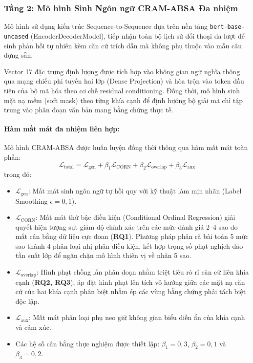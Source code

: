 \documentclass[pdflatex,sn-mathphys-num]{sn-jnl}
\theoremstyle{thmstyleone}
\theoremstyle{thmstyletwo}
\theoremstyle{thmstylethree}
\begin{document}
\subsubsection{Tầng 2: Mô hình Sinh Ngôn ngữ CRAM-ABSA Đa nhiệm}
Mô hình sử dụng kiến trúc Sequence-to-Sequence dựa trên nền tảng \texttt{bert-base-uncased} (EncoderDecoderModel), tiếp nhận toàn bộ lịch sử đối thoại đa lượt để sinh phản hồi tự nhiên kèm căn cứ trích dẫn mà không phụ thuộc vào mẫu câu dựng sẵn.

Vector 17 đặc trưng định lượng được tích hợp vào không gian ngữ nghĩa thông qua mạng chiếu phi tuyến hai lớp (Dense Projection) và hòa trộn vào token đầu tiên của bộ mã hóa theo cơ chế residual conditioning. Đồng thời, mô hình sinh mặt nạ mềm (soft mask) theo từng khía cạnh để định hướng bộ giải mã chỉ tập trung vào phân đoạn văn bản mang bằng chứng thực tế.

\paragraph{Hàm mất mát đa nhiệm liên hợp:}
Mô hình CRAM-ABSA được huấn luyện đồng thời thông qua hàm mất mát toàn phần:
\begin{equation}
    \label{eq:total_loss}
    \mathcal{L}_{\text{total}} = \mathcal{L}_{\text{gen}} + \beta_1 \mathcal{L}_{\text{CORN}} + \beta_2 \mathcal{L}_{\text{overlap}} + \beta_3 \mathcal{L}_{\text{aux}}
\end{equation}
trong đó:
\begin{itemize}
    \item $\mathcal{L}_{\text{gen}}$: Mất mát sinh ngôn ngữ tự hồi quy với kỹ thuật làm mịn nhãn (Label Smoothing $\epsilon = 0{,}1$).
    \item $\mathcal{L}_{\text{CORN}}$: Mất mát thứ bậc điều kiện (Conditional Ordinal Regression) giải quyết hiện tượng sụt giảm độ chính xác trên các mức đánh giá 2--4 sao do mất cân bằng dữ liệu cực đoan (\textbf{RQ1}). Phương pháp phân rã bài toán 5 mức sao thành 4 phân loại nhị phân điều kiện, kết hợp trọng số phạt nghịch đảo tần suất lớp để ngăn chặn mô hình thiên vị về nhãn 5 sao.
    \item $\mathcal{L}_{\text{overlap}}$: Hình phạt chồng lấn phân đoạn nhằm triệt tiêu rò rỉ căn cứ liên khía cạnh (\textbf{RQ2, RQ3}), áp đặt hình phạt lên tích vô hướng giữa các mặt nạ căn cứ của hai khía cạnh phân biệt nhằm ép các vùng bằng chứng phải tách biệt độc lập.
    \item $\mathcal{L}_{\text{aux}}$: Mất mát phân loại phụ neo giữ không gian biểu diễn ẩn của khía cạnh và cảm xúc.
    \item Các hệ số cân bằng thực nghiệm được thiết lập: $\beta_1 = 0{,}3$, $\beta_2 = 0{,}1$ và $\beta_3 = 0{,}2$.
\end{itemize}
\end{document}
